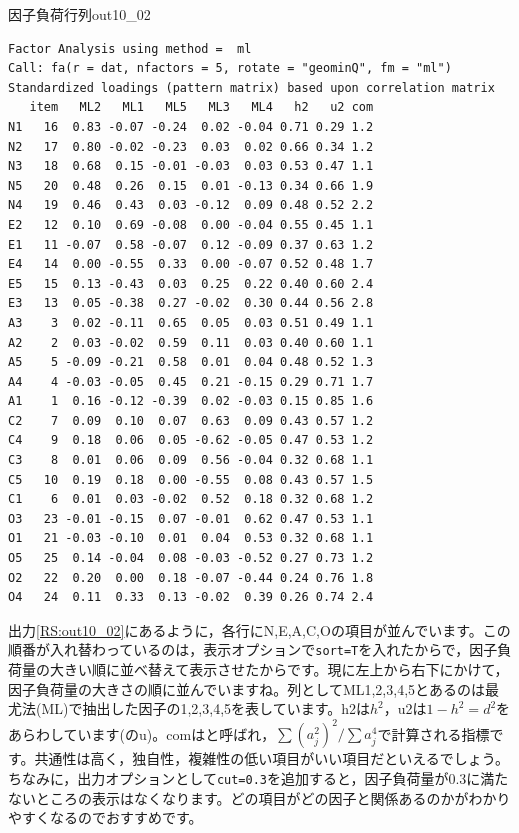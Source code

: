 \documentclass{ltjsbook}
\begin{document}
\begin{Rscreen}{因子負荷行列}{out10_02}
    \begin{verbatim}
Factor Analysis using method =  ml
Call: fa(r = dat, nfactors = 5, rotate = "geominQ", fm = "ml")
Standardized loadings (pattern matrix) based upon correlation matrix
   item   ML2   ML1   ML5   ML3   ML4   h2   u2 com
N1   16  0.83 -0.07 -0.24  0.02 -0.04 0.71 0.29 1.2
N2   17  0.80 -0.02 -0.23  0.03  0.02 0.66 0.34 1.2
N3   18  0.68  0.15 -0.01 -0.03  0.03 0.53 0.47 1.1
N5   20  0.48  0.26  0.15  0.01 -0.13 0.34 0.66 1.9
N4   19  0.46  0.43  0.03 -0.12  0.09 0.48 0.52 2.2
E2   12  0.10  0.69 -0.08  0.00 -0.04 0.55 0.45 1.1
E1   11 -0.07  0.58 -0.07  0.12 -0.09 0.37 0.63 1.2
E4   14  0.00 -0.55  0.33  0.00 -0.07 0.52 0.48 1.7
E5   15  0.13 -0.43  0.03  0.25  0.22 0.40 0.60 2.4
E3   13  0.05 -0.38  0.27 -0.02  0.30 0.44 0.56 2.8
A3    3  0.02 -0.11  0.65  0.05  0.03 0.51 0.49 1.1
A2    2  0.03 -0.02  0.59  0.11  0.03 0.40 0.60 1.1
A5    5 -0.09 -0.21  0.58  0.01  0.04 0.48 0.52 1.3
A4    4 -0.03 -0.05  0.45  0.21 -0.15 0.29 0.71 1.7
A1    1  0.16 -0.12 -0.39  0.02 -0.03 0.15 0.85 1.6
C2    7  0.09  0.10  0.07  0.63  0.09 0.43 0.57 1.2
C4    9  0.18  0.06  0.05 -0.62 -0.05 0.47 0.53 1.2
C3    8  0.01  0.06  0.09  0.56 -0.04 0.32 0.68 1.1
C5   10  0.19  0.18  0.00 -0.55  0.08 0.43 0.57 1.5
C1    6  0.01  0.03 -0.02  0.52  0.18 0.32 0.68 1.2
O3   23 -0.01 -0.15  0.07 -0.01  0.62 0.47 0.53 1.1
O1   21 -0.03 -0.10  0.01  0.04  0.53 0.32 0.68 1.1
O5   25  0.14 -0.04  0.08 -0.03 -0.52 0.27 0.73 1.2
O2   22  0.20  0.00  0.18 -0.07 -0.44 0.24 0.76 1.8
O4   24  0.11  0.33  0.13 -0.02  0.39 0.26 0.74 2.4
\end{verbatim}
\end{Rscreen}
出力\ref{RS:out10_02}にあるように，各行にN,E,A,C,Oの項目が並んでいます。この順番が入れ替わっているのは，表示オプションで\verb|sort=T|を入れたからで，因子負荷量の大きい順に並べ替えて表示させたからです。現に左上から右下にかけて，因子負荷量の大きさの順に並んでいますね。列としてML1,2,3,4,5とあるのは最尤法(ML)で抽出した因子の1,2,3,4,5を表しています。h2は$h^2$，u2は$1-h^2=d^2$をあらわしています(のu)。comはと呼ばれ，$\sum (a_j^2)^2/\sum a_j^4$で計算される指標です。共通性は高く，独自性，複雑性の低い項目がいい項目だといえるでしょう。ちなみに，出力オプションとして\verb|cut=0.3|を追加すると，因子負荷量が0.3に満たないところの表示はなくなります。どの項目がどの因子と関係あるのかがわかりやすくなるのでおすすめです。
\end{document}

